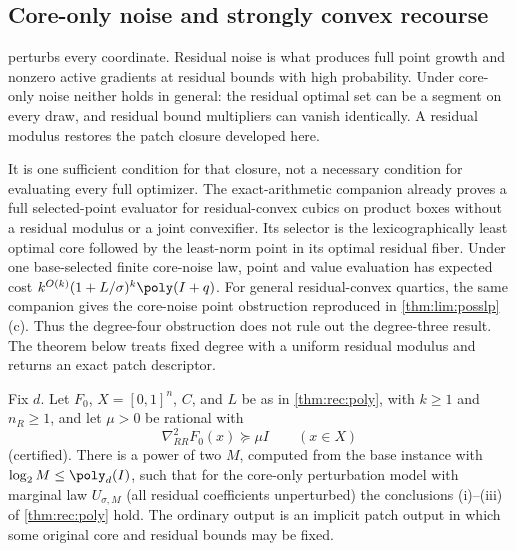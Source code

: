 \subsection{Core-only noise and strongly convex recourse}\label{sec:rec:core-only}

 perturbs every coordinate. Residual noise is what
produces full point growth and nonzero active gradients at residual bounds
with high probability. Under core-only noise neither holds in general: the
residual optimal set can be a segment on every draw, and residual bound
multipliers can vanish identically. A residual modulus restores the patch
closure developed here.

It is one sufficient condition for that closure, not a necessary condition
for evaluating every full optimizer. The exact-arithmetic companion
\citep{companion-exact-arithmetic}
already proves a full selected-point evaluator for residual-convex cubics
on product boxes without a residual modulus or a joint convexifier. Its
selector is the lexicographically least optimal core followed by the
least-norm point in its optimal residual fiber. Under one base-selected
finite core-noise law, point and value evaluation has expected cost
$k^{O(k)}(1+L/\sigma)^k\poly(I+q)$. For general residual-convex quartics,
the same companion gives the core-noise point obstruction reproduced in
\cref{thm:lim:posslp}(c). Thus the degree-four obstruction does not rule out
the degree-three result. The theorem below treats fixed degree with a
uniform residual modulus and returns an exact patch descriptor.

\begin{theorem}\label{thm:rec:core-only}
Fix $d$. Let $F_0$, $X=[0,1]^n$, $C$, and $L$ be as in \cref{thm:rec:poly},
with $k\ge1$ and $n_R\ge1$, and let $\mu>0$ be rational with
\begin{equation}\label{eq:rec:mu}
 \nabla^2_{RR}F_0(x)\succeq\mu I\qquad(x\in X)
\end{equation}
(certified). There is a power of two $M$, computed from the base instance
with $\log_2M\le\poly_d(I)$, such that for the core-only perturbation model
with marginal law $U_{\sigma,M}$ (all residual coefficients unperturbed) the
conclusions (i)--(iii) of \cref{thm:rec:poly} hold. The ordinary output is
an implicit patch output in which some original core and residual bounds may
be fixed.
\end{theorem}

